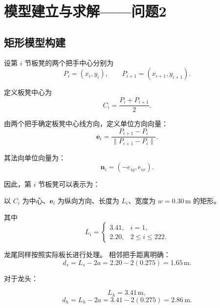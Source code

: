 
\section{模型建立与求解——问题2}

\subsection{矩形模型构建}
设第 $i$ 节板凳的两个把手中心分别为
\begin{equation}
P_i = (x_i, y_i), \qquad P_{i+1} = (x_{i+1}, y_{i+1}).
\end{equation}

定义板凳中心为
\begin{equation}
C_i = \frac{P_i + P_{i+1}}{2}.
\end{equation}

由两个把手确定板凳中心线方向，定义单位方向向量：
\begin{equation}
\mathbf{e}_i = \frac{P_{i+1} - P_i}{\|P_{i+1} - P_i\|}.
\end{equation}

其法向单位向量为：
\begin{equation}
\mathbf{n}_i = (-e_{iy}, e_{ix}).
\end{equation}

因此，第 $i$ 节板凳可以表示为：

以 $C_i$ 为中心、$\mathbf{e}_i$ 为纵向方向、长度为 $L_i$、宽度为 $w = 0.30\,\mathrm{m}$ 的矩形。

其中
\begin{equation}
L_i =
\begin{cases}
3.41, & i=1, \\[4pt]
2.20, & 2 \le i \le 222.
\end{cases}
\end{equation}

龙尾同样按照实际板长进行处理。
相邻把手距离明确：
\begin{equation*}
d_s = L_s - 2a = 2.20 - 2(0.275) = 1.65\,\mathrm{m}.
\end{equation*}

对于龙头：

\begin{equation*}
L_h = 3.41\,\mathrm{m},
\end{equation*}
\begin{equation*}
d_h = L_h - 2a = 3.41 - 2(0.275) = 2.86\,\mathrm{m}.
\end{equation*}




